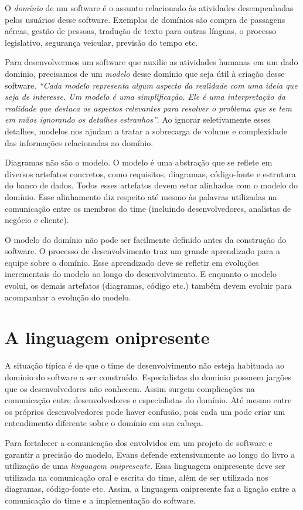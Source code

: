 \documentclass[a4paper, 12pt]{article}
\newcommand{\citacao}[1]{\emph{``#1''}}
\newcommand{\lgg}{linguagem onipresente\xspace}
\begin{document}
O \emph{domínio} de um software é o assunto relacionado às atividades desempenhadas pelos usuários desse software. Exemplos de domínios são compra de passagens aéreas, gestão de pessoas, tradução de texto para outras línguas, o processo legislativo, segurança veicular, previsão do tempo etc.

Para desenvolvermos um software que auxilie as atividades humanas em um dado domínio, precisamos de um \emph{modelo} desse domínio que seja útil à criação desse software. \citacao{Cada modelo representa algum aspecto da realidade com uma ideia que seja de interesse. Um modelo é uma simplificação. Ele é uma interpretação da realidade que destaca os aspectos relevantes para resolver o problema que se tem em mãos ignorando os detalhes estranhos}. Ao ignorar seletivamente esses detalhes, modelos nos ajudam a tratar a sobrecarga de volume e complexidade das informações relacionadas ao domínio. 

Diagramas não são o modelo. O modelo é uma abstração que se reflete em diversos artefatos concretos, como requisitos, diagramas, código-fonte e estrutura do banco de dados. Todos esses artefatos devem estar alinhados com o modelo do domínio. Esse alinhamento diz respeito até mesmo às palavras utilizadas na comunicação entre os membros do time (incluindo desenvolvedores, analistas de negócio e cliente).

O modelo do domínio não pode ser facilmente definido antes da construção do software. O processo de desenvolvimento traz um grande aprendizado para a equipe sobre o domínio. Esse aprendizado deve se refletir em evoluções incrementais do modelo ao longo do desenvolvimento. E enquanto o modelo evolui, os demais artefatos (diagramas, código etc.) também devem evoluir para acompanhar a evolução do modelo. 

\section{A linguagem onipresente}

A situação típica é de que o time de desenvolvimento não esteja habituada ao domínio do software a ser construído. Especialistas do domínio possuem jargões que os desenvolvedores não conhecem. Assim surgem complicações na comunicação entre desenvolvedores e especialistas do domínio. Até mesmo entre os próprios desenvolvedores pode haver confusão, pois cada um pode criar um entendimento diferente sobre o domínio em sua cabeça.

Para fortalecer a comunicação dos envolvidos em um projeto de software e garantir a precisão do modelo, Evans defende extensivamente ao longo do livro a utilização de uma \emph{linguagem onipresente}. Essa linguagem onipresente deve ser utilizada na comunicação oral e escrita do time, além de ser utilizada nos diagramas, código-fonte etc. Assim, a \lgg faz a ligação entre a comunicação do time e a implementação do software.
\end{document}
